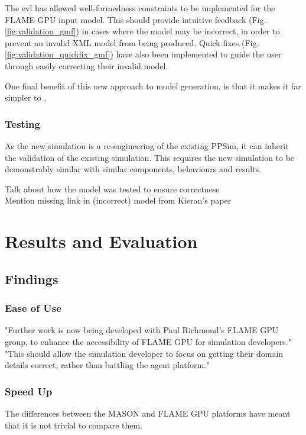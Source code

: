 \documentclass{UoYCSproject}
\begin{document}
The \gls{evl} has allowed well-formedness constraints to be implemented for the \gls{FLAME GPU} input model.
This should provide intuitive feedback (Fig. \ref{fig:validation_gmf}) in cases where the model may be incorrect, in order to prevent an invalid XML model from being produced.
Quick fixes (Fig. \ref{fig:validation_quickfix_gmf}) have also been implemented to guide the user through easily correcting their invalid model.

One final benefit of this new approach to model generation, is that it makes it far simpler to .


\subsection{Testing}
As the new simulation is a re-engineering of the existing PPSim, it can inherit the validation of the existing simulation.
This requires the new simulation to be demonstrably similar with similar components, behaviours and results.

Talk about how the model was tested to ensure correctness\\
Mention missing link in (incorrect) model from Kieran's paper 

\chapter{Results and Evaluation}
\label{results}


\section{Findings}
\subsection{Ease of Use}
"Further work is now being developed with Paul Richmond's \gls{FLAME GPU} group, to enhance the accessibility of \gls{FLAME GPU} for simulation developers."
"This should allow the simulation developer to focus on getting their domain details correct, rather than battling the agent platform."

\subsection{Speed Up}
The differences between the \gls{MASON} and \gls{FLAME GPU} platforms have meant that it is not trivial to compare them.
\end{document}
